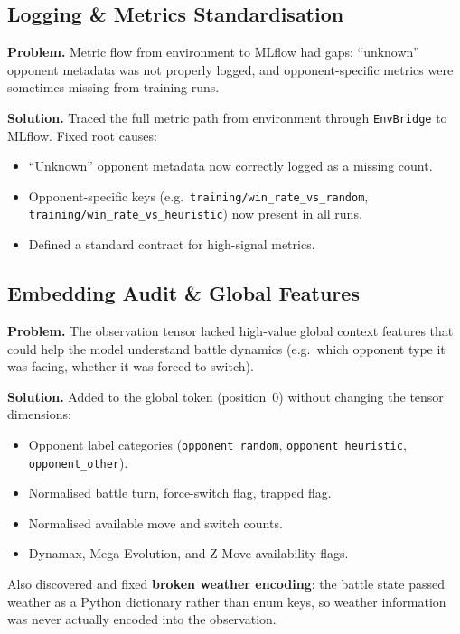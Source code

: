 \subsection{Logging \& Metrics Standardisation}

\textbf{Problem.} Metric flow from environment to MLflow had gaps:
``unknown'' opponent metadata was not properly logged, and opponent-specific
metrics were sometimes missing from training runs.

\textbf{Solution.} Traced the full metric path from environment through
\texttt{EnvBridge} to MLflow.  Fixed root causes:
\begin{itemize}
  \item ``Unknown'' opponent metadata now correctly logged as a missing count.
  \item Opponent-specific keys (e.g.\
        \texttt{training/win\_rate\_vs\_random},
        \texttt{training/win\_rate\_vs\_heuristic}) now present in all runs.
  \item Defined a standard contract for high-signal metrics.
\end{itemize}

\subsection{Embedding Audit \& Global Features}

\textbf{Problem.} The observation tensor lacked high-value global context
features that could help the model understand battle dynamics (e.g.\ which
opponent type it was facing, whether it was forced to switch).

\textbf{Solution.} Added to the global token (position~0) without changing
the tensor dimensions:
\begin{itemize}
  \item Opponent label categories (\texttt{opponent\_random},
        \texttt{opponent\_heuristic}, \texttt{opponent\_other}).
  \item Normalised battle turn, force-switch flag, trapped flag.
  \item Normalised available move and switch counts.
  \item Dynamax, Mega Evolution, and Z-Move availability flags.
\end{itemize}

Also discovered and fixed \textbf{broken weather encoding}: the battle state
passed weather as a Python dictionary rather than enum keys, so weather
information was never actually encoded into the observation.


